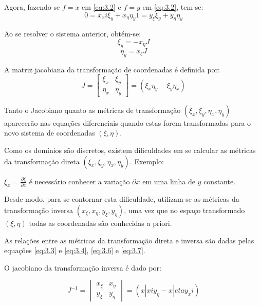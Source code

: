 Agora, fazendo-se $f=x$ em \ref{eq:3.2} e $f=y$ em \ref{eq:3.2}, tem-se:
\begin{equation*}
    0 = x_xi \xi_y + x_\eta \eta_y
    1 = y_\xi \xi_y + y_\eta \eta_y
\end{equation*}

Ao se resolver o sistema anterior, obtém-se:
\begin{equation}
    \label{eq:3.6}
    \xi_y = -x_\eta J
\end{equation}
\begin{equation}
    \label{eq:3.7}
    \eta_y = x_\xi J
\end{equation}

A matriz jacobiana da transformação de coordenadas é definida por:
\begin{equation}
    \label{eq:3.8}
    J =
    \begin{bmatrix}
        \xi_x & \xi_y\\
        \eta_x & \eta_y
    \end{bmatrix}
    = (\xi_x \eta_y - \xi_y \eta_x)
\end{equation}

Tanto o Jacobiano quanto as métricas de transformação $(\xi_x, \xi_y, \eta_x, \eta_y)$ aparecerão nas equações diferenciais quando estas forem transformadas para o novo sistema de coordenadas $(\xi,\eta)$.

Como os domínios são discretos, existem dificuldades em se calcular as métricas da transformação direta $(\xi_x, \xi_y, \eta_x, \eta_y)$. Exemplo:

$\xi_x=\frac{\partial \xi}{\partial x}$ é necessário conhecer a variação $\partial x$ em uma linha de $y$ constante.

Desde modo, para se contornar esta dificuldade, utilizam-se as métricas da transformação inversa $(x_\xi, x_\eta, y_\xi, y_\eta)$, uma vez que no espaço transformado $(\xi, \eta)$ todas as coordenadas são conhecidas a priori.

As relações entre as métricas da transformação direta e inversa são dadas pelas equações \ref{eq:3.3} e \ref{eq:3.4}, \ref{eq:3.6} e \ref{eq:3.7}.

O jacobiano da transformação inversa é dado por:

\begin{equation}
    \label{eq:3.9}
    J^{-1} =
    \begin{vmatrix}
        x_\xi & x_\eta\\
        y_\xi & y_\eta
    \end{vmatrix}
    = (x|xi y_\eta - x|eta y_xi)
\end{equation}

